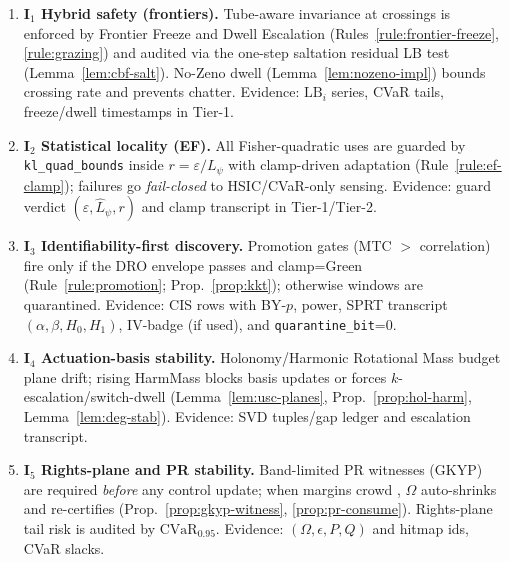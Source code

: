 \begin{enumerate}[leftmargin=*]
\item \textbf{I\(_1\) Hybrid safety (frontiers).}
Tube-aware invariance at crossings is enforced by Frontier Freeze and Dwell Escalation (Rules~\ref{rule:frontier-freeze}, \ref{rule:grazing}) and audited via the one-step saltation residual LB test (Lemma~\ref{lem:cbf-salt}). No-Zeno dwell (Lemma~\ref{lem:nozeno-impl}) bounds crossing rate and prevents chatter. Evidence: $\mathrm{LB}_i$ series, CVaR tails, freeze/dwell timestamps in Tier-1.

\item \textbf{I\(_2\) Statistical locality (EF).}
All Fisher-quadratic uses are guarded by \texttt{kl\_quad\_bounds} inside $r=\varepsilon/L_\psi$ with clamp-driven adaptation (Rule~\ref{rule:ef-clamp}); failures go \emph{fail-closed} to HSIC/CVaR-only sensing. Evidence: guard verdict $(\varepsilon,\hat L_\psi,r)$ and clamp transcript in Tier-1/Tier-2.

\item \textbf{I\(_3\) Identifiability-first discovery.}
Promotion gates (MTC $>$ correlation) fire only if the DRO envelope passes and clamp=Green (Rule~\ref{rule:promotion}; Prop.~\ref{prop:kkt}); otherwise windows are quarantined. Evidence: CIS rows with BY-$p$, power, SPRT transcript $(\alpha,\beta,H_0,H_1)$, IV-badge (if used), and \texttt{quarantine\_bit}=0.

\item \textbf{I\(_4\) Actuation-basis stability.}
Holonomy/Harmonic Rotational Mass budget plane drift; rising HarmMass blocks basis updates or forces $k$-escalation/switch-dwell (Lemma~\ref{lem:usc-planes}, Prop.~\ref{prop:hol-harm}, Lemma~\ref{lem:deg-stab}). Evidence: SVD tuples/gap ledger and escalation transcript.

\item \textbf{I\(_5\) Rights-plane and PR stability.}
Band-limited PR witnesses (GKYP) are required \emph{before} any control update; when margins crowd \constsymPRmargin, $\Omega$ auto-shrinks and re-certifies (Prop.~\ref{prop:gkyp-witness}, \ref{prop:pr-consume}). Rights-plane tail risk is audited by $\mathrm{CVaR}_{0.95}$. Evidence: $(\Omega,\epsilon,P,Q)$ and hitmap ids, CVaR slacks.
\end{enumerate}

